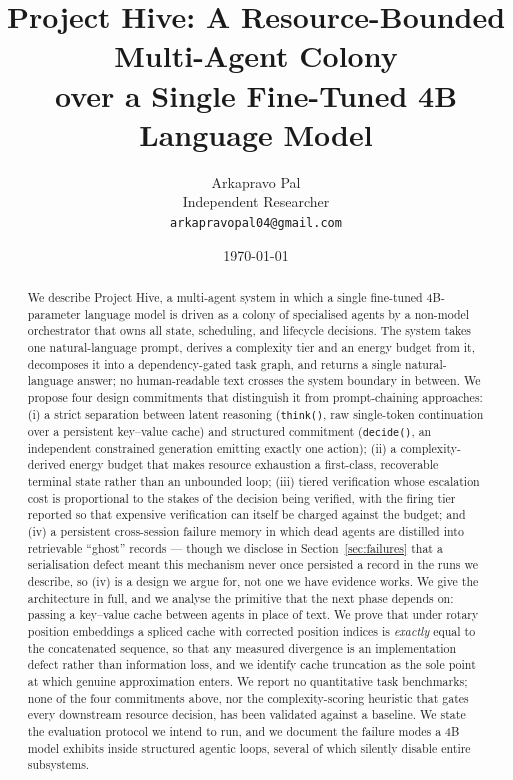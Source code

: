 \documentclass[11pt]{article}
\title{\textbf{Project Hive: A Resource-Bounded Multi-Agent Colony\\
over a Single Fine-Tuned 4B Language Model}}
\author{Arkapravo Pal\\
\small Independent Researcher\\
\small \texttt{arkapravopal04@gmail.com}}
\date{\today}
\begin{document}
\maketitle

\begin{abstract}
We describe Project Hive, a multi-agent system in which a single fine-tuned
4B-parameter language model is driven as a colony of specialised agents by a
non-model orchestrator that owns all state, scheduling, and lifecycle
decisions. The system takes one natural-language prompt, derives a complexity
tier and an energy budget from it, decomposes it into a dependency-gated task
graph, and returns a single natural-language answer; no human-readable text
crosses the system boundary in between. We propose four design commitments
that distinguish it from prompt-chaining approaches: (i) a strict separation
between latent reasoning (\texttt{think()}, raw single-token continuation over
a persistent key--value cache) and structured commitment (\texttt{decide()},
an independent constrained generation emitting exactly one action); (ii) a
complexity-derived energy budget that makes resource exhaustion a first-class,
recoverable terminal state rather than an unbounded loop; (iii) tiered
verification whose escalation cost is proportional to the stakes of the
decision being verified, with the firing tier reported so that expensive
verification can itself be charged against the budget; and (iv) a persistent
cross-session failure memory in which dead agents are distilled into
retrievable ``ghost'' records --- though we disclose in
Section~\ref{sec:failures} that a serialisation defect meant this mechanism
never once persisted a record in the runs we describe, so (iv) is a design we
argue for, not one we have evidence works. We give the architecture in full,
and we analyse the primitive that the next phase depends on: passing a
key--value cache between agents in place of text. We prove that under rotary
position embeddings a spliced cache with corrected position indices is
\emph{exactly} equal to the concatenated sequence, so that any measured
divergence is an implementation defect rather than information loss, and we
identify cache truncation as the sole point at which genuine approximation
enters. We report no quantitative task benchmarks; none of the four
commitments above, nor the complexity-scoring heuristic that gates every
downstream resource decision, has been validated against a baseline. We state
the evaluation protocol we intend to run, and we document the failure modes a
4B model exhibits inside structured agentic loops, several of which silently
disable entire subsystems.
\end{abstract}
\end{document}
